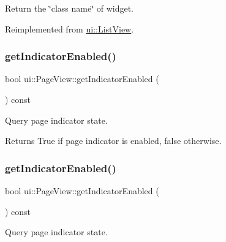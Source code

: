 Return the \char`\"{}class name\char`\"{} of widget. 

Reimplemented from \hyperlink{classui_1_1ListView_a653bb454095ef227949f7c791b68180c}{ui\+::\+List\+View}.

\mbox{\label{classui_1_1PageView_a15476071cbcf8fc025760426298a2dff}} 
\subsubsection{\texorpdfstring{get\+Indicator\+Enabled()}{getIndicatorEnabled()}\hspace{0.1cm}{\footnotesize\ttfamily [1/2]}}
{\footnotesize\ttfamily bool ui\+::\+Page\+View\+::get\+Indicator\+Enabled (\begin{DoxyParamCaption}{ }\end{DoxyParamCaption}) const\hspace{0.3cm}{\ttfamily [inline]}}



Query page indicator state. 

\begin{DoxyReturn}{Returns}
True if page indicator is enabled, false otherwise. 
\end{DoxyReturn}
\mbox{\label{classui_1_1PageView_a15476071cbcf8fc025760426298a2dff}} 
\subsubsection{\texorpdfstring{get\+Indicator\+Enabled()}{getIndicatorEnabled()}\hspace{0.1cm}{\footnotesize\ttfamily [2/2]}}
{\footnotesize\ttfamily bool ui\+::\+Page\+View\+::get\+Indicator\+Enabled (\begin{DoxyParamCaption}{ }\end{DoxyParamCaption}) const\hspace{0.3cm}{\ttfamily [inline]}}



Query page indicator state. 

